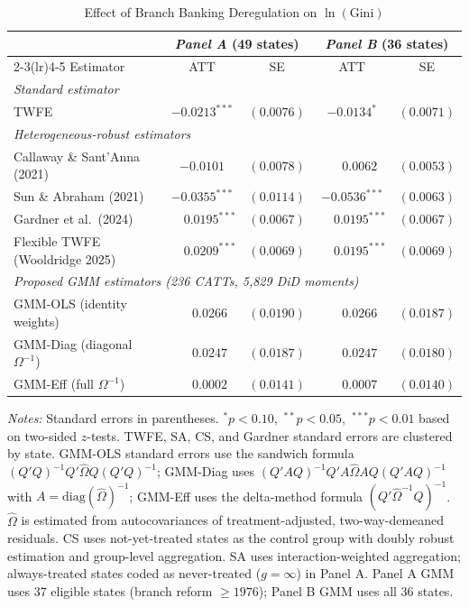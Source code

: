 \begin{table}[htbp]
\centering
\caption{Effect of Branch Banking Deregulation on $\ln(\text{Gini})$}
\label{tab:beck_results}
\begin{threeparttable}
\begin{tabular}{lcccc}
\toprule
 & \multicolumn{2}{c}{\textit{Panel A} (49 states)}
 & \multicolumn{2}{c}{\textit{Panel B} (36 states)} \\
\cmidrule(lr){2-3}\cmidrule(lr){4-5}
Estimator & ATT & SE & ATT & SE \\
\midrule
\multicolumn{5}{l}{\textit{Standard estimator}} \\[2pt]
TWFE
  & $-0.0213^{***}$ & $(0.0076)$
  & $-0.0134^{*}$   & $(0.0071)$ \\[4pt]
\multicolumn{5}{l}{\textit{Heterogeneous-robust estimators}} \\[2pt]
Callaway \& Sant'Anna (2021)
  & $-0.0101$       & $(0.0078)$
  & $\phantom{-}0.0062$  & $(0.0053)$ \\
Sun \& Abraham (2021)
  & $-0.0355^{***}$ & $(0.0114)$
  & $-0.0536^{***}$ & $(0.0063)$ \\
Gardner et al.\ (2024)
  & $\phantom{-}0.0195^{***}$ & $(0.0067)$
  & $\phantom{-}0.0195^{***}$ & $(0.0067)$ \\
Flexible TWFE (Wooldridge 2025)
  & $\phantom{-}0.0209^{***}$ & $(0.0069)$
  & $\phantom{-}0.0195^{***}$ & $(0.0069)$ \\[4pt]
\multicolumn{5}{l}{\textit{Proposed GMM estimators (236 CATTs, 5{,}829 DiD moments)}} \\[2pt]
GMM-OLS (identity weights)
  & $\phantom{-}0.0266$       & $(0.0190)$
  & $\phantom{-}0.0266$       & $(0.0187)$ \\
GMM-Diag (diagonal $\Omega^{-1}$)
  & $\phantom{-}0.0247$       & $(0.0187)$
  & $\phantom{-}0.0247$       & $(0.0180)$ \\
GMM-Eff (full $\Omega^{-1}$)
  & $\phantom{-}0.0002$       & $(0.0141)$
  & $\phantom{-}0.0007$       & $(0.0140)$ \\
\bottomrule
\end{tabular}
\begin{tablenotes}[flushleft]\small
\item \textit{Notes:} Standard errors in parentheses.
  $^{*}p<0.10$,\ $^{**}p<0.05$,\ $^{***}p<0.01$ based on two-sided $z$-tests.
  TWFE, SA, CS, and Gardner standard errors are clustered by state.
  GMM-OLS standard errors use the sandwich formula
  $(Q'Q)^{-1}Q'\hat{\Omega}Q(Q'Q)^{-1}$;
  GMM-Diag uses $(Q'AQ)^{-1}Q'A\hat{\Omega}AQ(Q'AQ)^{-1}$
  with $A = \mathrm{diag}(\hat{\Omega})^{-1}$;
  GMM-Eff uses the delta-method formula $(Q'\hat{\Omega}^{-1}Q)^{-1}$.
  $\hat{\Omega}$ is estimated from autocovariances of
  treatment-adjusted, two-way-demeaned residuals.
  CS uses not-yet-treated states as the control group with doubly robust
  estimation and group-level aggregation.
  SA uses interaction-weighted aggregation; always-treated states coded
  as never-treated ($g = \infty$) in Panel A.
  Panel A GMM uses 37 eligible states (branch reform $\geq 1976$);
  Panel B GMM uses all 36 states.
\end{tablenotes}
\end{threeparttable}
\end{table}
